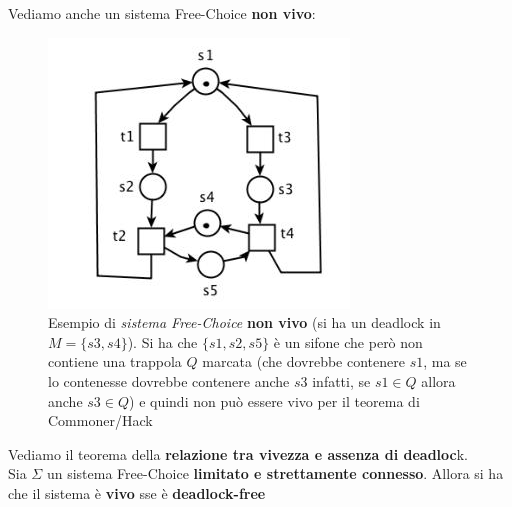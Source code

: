 \documentclass[a4paper,12pt, oneside]{book}
\begin{document}
\begin{esempio}
  Vediamo anche un sistema Free-Choice \textbf{non vivo}:
\begin{figure}[H]
    \centering
    \includegraphics[scale = 0.55]{img/fc5.jpg}
    \caption{Esempio di \emph{sistema Free-Choice} \textbf{non vivo} (si ha un
      deadlock in $M=\{s3,s4\}$). Si ha che $\{s1,s2,s5\} $ è un sifone che però
    non contiene una trappola $Q$ marcata (che dovrebbe contenere $s1$, ma se lo
    contenesse dovrebbe contenere anche $s3$ infatti, se $s1 \in Q$ allora anche
    $s3 \in Q$) e quindi non può essere vivo per il teorema di Commoner/Hack}  
\end{figure}
\end{esempio}
\begin{teorema}
  Vediamo il teorema della \textbf{relazione tra vivezza e assenza di
    deadloc}k.\\
  Sia $\Sigma$ un sistema Free-Choice \textbf{limitato e strettamente
    connesso}. Allora si ha che il sistema è \textbf{vivo} sse è 
  \textbf{deadlock-free} 
\end{teorema}
\end{document}
